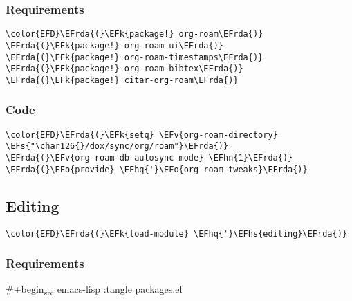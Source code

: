 \documentclass[a4wide,10pt]{article}
\newcommand{\EFs}[1]{\textcolor{EFs}{#1}} %
\newcommand{\EFk}[1]{\textcolor{EFk}{#1}} %
\newcommand{\EFv}[1]{\textcolor{EFv}{#1}} %
\newcommand{\EFo}[1]{\textcolor{EFo}{#1}} %
\newcommand{\EFhn}[1]{\textcolor{EFhn}{\textbf{#1}}} %
\newcommand{\EFhq}[1]{\textcolor{EFhq}{#1}} %
\newcommand{\EFhs}[1]{\textcolor{EFhs}{#1}} %
\newcommand{\EFrda}[1]{\textcolor{EFrda}{#1}} %
\begin{document}
\subsubsection{Requirements}
\label{sec:org88792ec}
\begin{Code}
\begin{Verbatim}
\color{EFD}\EFrda{(}\EFk{package!} org-roam\EFrda{)}
\EFrda{(}\EFk{package!} org-roam-ui\EFrda{)}
\EFrda{(}\EFk{package!} org-roam-timestamps\EFrda{)}
\EFrda{(}\EFk{package!} org-roam-bibtex\EFrda{)}
\EFrda{(}\EFk{package!} citar-org-roam\EFrda{)}
\end{Verbatim}
\end{Code}
\subsubsection{Code}
\label{sec:orgb4cabad}
\begin{Code}
\begin{Verbatim}
\color{EFD}\EFrda{(}\EFk{setq} \EFv{org-roam-directory} \EFs{"\char126{}/dox/sync/org/roam"}\EFrda{)}
\EFrda{(}\EFv{org-roam-db-autosync-mode} \EFhn{1}\EFrda{)}
\EFrda{(}\EFo{provide} \EFhq{'}\EFo{org-roam-tweaks}\EFrda{)}
\end{Verbatim}
\end{Code}

\subsection{Editing}
\label{sec:orga86775d}
\begin{Code}
\begin{Verbatim}
\color{EFD}\EFrda{(}\EFk{load-module} \EFhq{'}\EFhs{editing}\EFrda{)}
\end{Verbatim}
\end{Code}
\subsubsection{Requirements}
\label{sec:orgb9b5b27}
\#+begin\textsubscript{src} emacs-lisp :tangle packages.el
\end{document}
